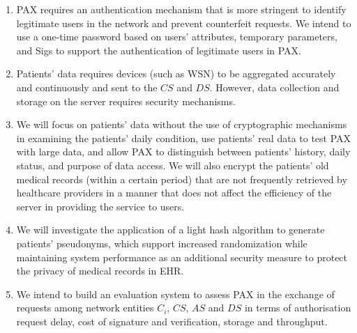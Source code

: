 \documentclass[journal,article,submit,moreauthors,pdftex]{Definitions/mdpi}
\begin{document}
\begin{enumerate}
\item PAX requires an authentication mechanism that is more stringent to identify legitimate users in the network and prevent counterfeit requests. We intend to use a one-time password based on users' attributes, temporary parameters, and Sigs to support the authentication of legitimate users in PAX.
\item Patients' data requires devices (such as WSN) to be aggregated accurately and continuously and sent to the $CS$ and $DS$. However, data collection and storage on the server requires security mechanisms.
\item We will focus on patients' data without the use of cryptographic mechanisms in examining the patients' daily condition, use patients' real data to test PAX with large data, and allow PAX to distinguish between patients' history, daily status, and purpose of data access. We will also encrypt the patients' old medical records (within a certain period) that are not frequently retrieved by healthcare providers in a manner that does not affect the efficiency of the server in providing the service to users.
\item We will investigate the application of a light hash algorithm to generate patients' pseudonyms, which support increased randomization while maintaining system performance as an additional security measure to protect the privacy of medical records in EHR.
\item  We intend to build an evaluation system to assess PAX in the exchange of requests among network entities $C_i$, $CS$, $AS$ and $DS$ in terms of authorisation request delay, cost of signature and verification, storage and throughput.
\end{enumerate}
\vspace{6pt}



\end{document}
